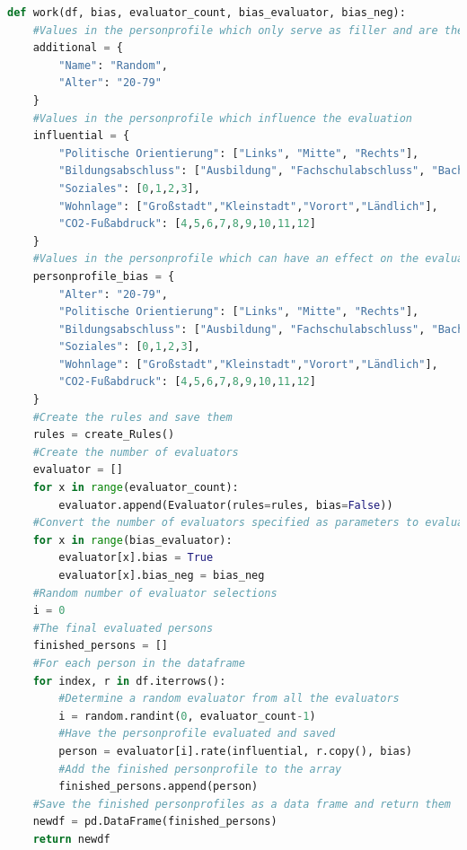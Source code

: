 \documentclass[a4paper,12pt]{report}
\begin{document}
\begin{lstlisting}[language=Python,label={lst:Sz2Z7},caption=Siebte Zelle Methode für den gesamt Ablauf]
def work(df, bias, evaluator_count, bias_evaluator, bias_neg):
    #Values in the personprofile which only serve as filler and are therefore irrelevant
    additional = {
        "Name": "Random",
        "Alter": "20-79"
    }
    #Values in the personprofile which influence the evaluation
    influential = {
        "Politische Orientierung": ["Links", "Mitte", "Rechts"],
        "Bildungsabschluss": ["Ausbildung", "Fachschulabschluss", "Bachelor", "Master", "Diplom", "Promotion","ohne"],
        "Soziales": [0,1,2,3],
        "Wohnlage": ["Großstadt","Kleinstadt","Vorort","Ländlich"],
        "CO2-Fußabdruck": [4,5,6,7,8,9,10,11,12]
    }
    #Values in the personprofile which can have an effect on the evaluation as a bias
    personprofile_bias = {
        "Alter": "20-79",
        "Politische Orientierung": ["Links", "Mitte", "Rechts"],
        "Bildungsabschluss": ["Ausbildung", "Fachschulabschluss", "Bachelor", "Master", "Diplom", "Promotion","ohne"],
        "Soziales": [0,1,2,3],
        "Wohnlage": ["Großstadt","Kleinstadt","Vorort","Ländlich"],
        "CO2-Fußabdruck": [4,5,6,7,8,9,10,11,12]
    }
    #Create the rules and save them
    rules = create_Rules()
    #Create the number of evaluators
    evaluator = []
    for x in range(evaluator_count):
        evaluator.append(Evaluator(rules=rules, bias=False))
    #Convert the number of evaluators specified as parameters to evaluators with a bias
    for x in range(bias_evaluator):
        evaluator[x].bias = True
        evaluator[x].bias_neg = bias_neg
    #Random number of evaluator selections
    i = 0
    #The final evaluated persons
    finished_persons = []
    #For each person in the dataframe
    for index, r in df.iterrows():
        #Determine a random evaluator from all the evaluators
        i = random.randint(0, evaluator_count-1)
        #Have the personprofile evaluated and saved
        person = evaluator[i].rate(influential, r.copy(), bias)
        #Add the finished personprofile to the array
        finished_persons.append(person)
    #Save the finished personprofiles as a data frame and return them
    newdf = pd.DataFrame(finished_persons)
    return newdf          
\end{lstlisting}
\end{document}
